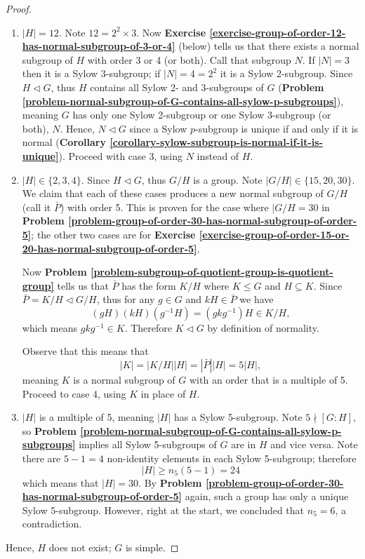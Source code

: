 \begin{proof}
\begin{enumerate}
        \item $|H| = 12$. Note $12 = 2^2 \times 3$. Now \textbf{Exercise \ref{exercise-group-of-order-12-has-normal-subgroup-of-3-or-4}} (below) tells us that there exists a normal subgroup of $H$ with order 3 or 4 (or both). Call that subgroup $N$. If $|N| = 3$ then it is a Sylow 3-subgroup; if $|N| = 4 = 2^2$ it is a Sylow 2-subgroup. Since $H \lhd G$, thus $H$ contains all Sylow 2- and 3-subgroups of $G$ (\textbf{Problem \ref{problem-normal-subgroup-of-G-contains-all-sylow-p-subgroups}}), meaning $G$ has only one Sylow 2-subgroup or one Sylow 3-subgroup (or both), $N$. Hence, $N \lhd G$ since a Sylow $p$-subgroup is unique if and only if it is normal (\textbf{Corollary \ref{corollary-sylow-subgroup-is-normal-if-it-is-unique}}). Proceed with case 3, using $N$ instead of $H$.
        
        \item $|H| \in \{2, 3, 4\}$. Since $H \lhd G$, thus $G/H$ is a group. Note $|G/H| \in \{15, 20, 30\}$. We claim that each of these cases produces a new normal subgroup of $G/H$ (call it $\bar{P}$) with order 5. This is proven for the case where $|G/H = 30$ in \textbf{Problem \ref{problem-group-of-order-30-has-normal-subgroup-of-order-5}}; the other two cases are for \textbf{Exercise \ref{exercise-group-of-order-15-or-20-has-normal-subgroup-of-order-5}}.

        Now \textbf{Problem \ref{problem-subgroup-of-quotient-group-is-quotient-group}} tells us that $\bar{P}$ has the form $K/H$ where $K \leq G$ and $H \subseteq K$. Since $\bar{P} = K/H \lhd G/H$, thus for any $g \in G$ and $kH \in \bar{P}$ we have
        \[
            (gH)(kH)(g^{-1}H) = (gkg^{-1})H \in K/H,
        \]
        which means $gkg^{-1} \in K$. Therefore $K \lhd G$ by definition of normality.

        Observe that this means that
        \[
            |K| = |K/H||H| = |\bar{P}||H| = 5|H|,    
        \]
        meaning $K$ is a normal subgroup of $G$ with an order that is a multiple of 5. Proceed to case 4, using $K$ in place of $H$.

        \item $|H|$ is a multiple of 5, meaning $|H|$ has a Sylow 5-subgroup. Note $5 \nmid [G:H]$, so \textbf{Problem \ref{problem-normal-subgroup-of-G-contains-all-sylow-p-subgroups}} implies all Sylow 5-subgroups of $G$ are in $H$ and vice versa. Note there are $5-1=4$ non-identity elements in each Sylow 5-subgroup; therefore
        \[
            |H| \geq n_5(5-1) = 24
        \]
        which means that $|H| = 30$. By \textbf{Problem \ref{problem-group-of-order-30-has-normal-subgroup-of-order-5}} again, such a group has only a unique Sylow 5-subgroup. However, right at the start, we concluded that $n_5 = 6$, a contradiction.
    \end{enumerate}
    Hence, $H$ does not exist; $G$ is simple.
\end{proof}

